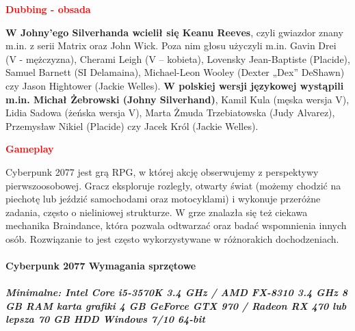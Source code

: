 \documentclass[a4paper]{article}
\begin{document}
{\huge\textcolor{red}{\textbf{Dubbing - obsada}}} \newline


\textbf{W Johny’ego Silverhanda wcielił się Keanu Reeves}, czyli gwiazdor znany m.in. z serii Matrix oraz John Wick. Poza nim głosu użyczyli m.in. Gavin Drei (V - mężczyzna), Cherami Leigh (V – kobieta), Lovensky Jean-Baptiste (Placide), Samuel Barnett (SI Delamaina), Michael-Leon Wooley (Dexter „Dex” DeShawn) czy Jason Hightower (Jackie Welles). \newline \newline
\textbf{W polskiej wersji językowej wystąpili m.in. Michał Żebrowski (Johny Silverhand)}, Kamil Kula (męska wersja V), Lidia Sadowa (żeńska wersja V), Marta Żmuda Trzebiatowska (Judy Alvarez), Przemysław Nikiel (Placide) czy Jacek Król (Jackie Welles). \newline

{\huge\textcolor{red}{\textbf{Gameplay}}}\newline

Cyberpunk 2077 jest grą RPG, w której akcję obserwujemy z perspektywy pierwszoosobowej. Gracz eksploruje rozległy, otwarty świat (możemy chodzić na piechotę lub jeździć samochodami oraz motocyklami) i wykonuje przeróżne zadania, często o nieliniowej strukturze. W grze znalazła się też ciekawa mechanika Braindance, która pozwala odtwarzać oraz badać wspomnienia innych osób. Rozwiązanie to jest często wykorzystywane w różnorakich dochodzeniach.
\newline \newline

 \paragraph{Cyberpunk 2077 {\textbf{Wymagania sprzętowe}}}
 	\subparagraph{{\textbf{Minimalne:}}
 	 Intel Core i5-3570K 3.4 GHz / AMD FX-8310 3.4 GHz 8 GB RAM karta grafiki 4 GB GeForce GTX 970 / Radeon RX 470 lub lepsza 70 GB HDD Windows 7/10 64-bit}
\end{document}
